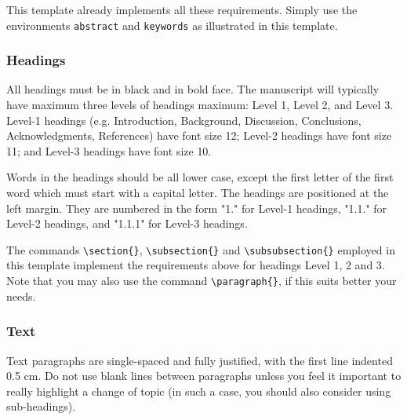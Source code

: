 \documentclass[a4paper, 10pt, twocolumn, twoside]{article}
\begin{document}
This template already implements all these requirements. Simply use the environments \verb|abstract| and \verb|keywords| as illustrated in this template.

\subsubsection{Headings}

All headings must be in black and in bold face. The manuscript will typically have maximum three levels of headings maximum: Level 1, Level 2, and Level 3. Level-1 headings (e.g. Introduction, Background, Discussion, Conclusions, Acknowledgments, References) have font size 12; Level-2 headings have font size 11; and Level-3 headings have font size 10. 

Words in the headings should be all lower case, except the first letter of the first word which must start with a capital letter. The headings are positioned at the left margin. They are numbered in the form "1." for Level-1 headings, "1.1." for Level-2 headings, and "1.1.1" for Level-3 headings.

The commands \verb|\section{}|, \verb|\subsection{}| and \verb|\subsubsection{}| employed in this template implement the requirements above for headings Level 1, 2 and 3.
Note that you may also use the command \verb|\paragraph{}|, if this suits better your needs.

\subsubsection{Text}

Text paragraphs are single-spaced and fully justified, with the first line indented 0.5 cm. Do not use blank lines between paragraphs unless you feel it important to really highlight a change of topic (in such a case, you should also consider using sub-headings).
\end{document}
